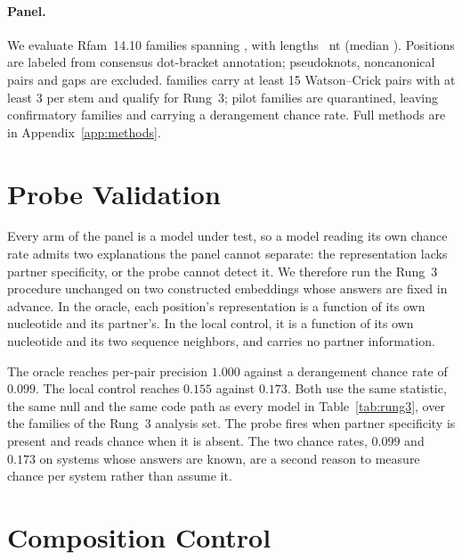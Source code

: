 \documentclass{article}
\begin{document}
\paragraph{Panel.} We evaluate \panelN{} Rfam~14.10 families
\citep{kalvari2021rfam} spanning \panelClasses{}, with lengths
\panelLengthRange{}~nt (median \panelLengthMedian{}). Positions are labeled from
consensus dot-bracket annotation; pseudoknots, noncanonical pairs and gaps are
excluded. \rungThreeQualifying{} families carry at least 15 Watson--Crick pairs
with at least 3 per stem and qualify for Rung~3;
\rungThreeQuarantined{} pilot families are quarantined, leaving
\confirmatoryN{} confirmatory families and \chanceRateN{} carrying a derangement
chance rate. Full methods are in Appendix~\ref{app:methods}.

\section{Probe Validation}
\label{sec:validation}

Every arm of the panel is a model under test, so a model reading its own chance
rate admits two explanations the panel cannot separate: the representation lacks
partner specificity, or the probe cannot detect it. We therefore run the Rung~3
procedure unchanged on two constructed embeddings whose answers are fixed in
advance. In the oracle, each position's representation is a function of its own
nucleotide and its partner's. In the local control, it is a function of its own
nucleotide and its two sequence neighbors, and carries no partner information.

The oracle reaches per-pair precision $1.000$ against a derangement chance rate
of $0.099$. The local control reaches $0.155$ against $0.173$. Both use the same
statistic, the same null and the same code path as every model in
Table~\ref{tab:rung3}, over the \chanceRateN{} families of the Rung~3 analysis
set. The probe fires when partner specificity is present and reads chance when
it is absent. The two chance rates, $0.099$ and $0.173$ on systems whose answers
are known, are a second reason to measure chance per system rather than assume
it.

\section{Composition Control}
\label{sec:composition}
\end{document}
